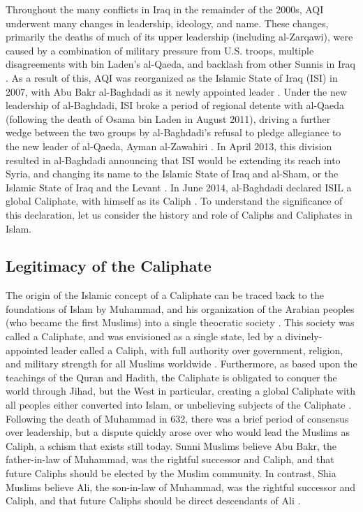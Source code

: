\documentclass{report}
\begin{document}
    Throughout the many conflicts in Iraq in the remainder of the 2000s, AQI underwent many changes in leadership, ideology, and name. These changes, primarily the deaths of much of its upper leadership (including al-Zarqawi), were caused by a combination of military pressure from U.S. troops, multiple disagreements  with bin Laden's al-Qaeda, and backlash from other Sunnis in Iraq \cite{Zelin2014,Kahl2008}. As a result of this, AQI was reorganized as the Islamic State of Iraq (ISI) in 2007, with Abu Bakr al-Baghdadi as it newly appointed leader \cite{Zelin2014,Shadid2010}. Under the new leadership of al-Baghdadi, ISI broke a period of regional detente with al-Qaeda (following the death of Osama bin Laden in August 2011), driving a further wedge between the two groups by al-Baghdadi's refusal to pledge allegiance to the new leader of al-Qaeda, Ayman al-Zawahiri \cite{Al-Jawlani}. In April 2013, this division resulted in  al-Baghdadi announcing that ISI would be extending its reach into Syria, and changing its name to the Islamic State of Iraq and al-Sham, or the Islamic State of Iraq and the Levant \cite{Zelin2014,Al-Hussaini2013}. In June 2014, al-Baghdadi declared ISIL a global Caliphate, with himself as its Caliph \cite{Mortada2014,TheWeek2014}. To understand the significance of this declaration, let us consider the history and role of Caliphs and Caliphates in Islam.
    
    


\subsection{Legitimacy of the Caliphate}

The origin of the Islamic concept of a Caliphate can be traced back to the foundations of Islam by Muhammad, and his organization of the Arabian peoples (who became the first Muslims) into a single theocratic society  \cite{schmidt2004great,holt1977cambridge}. This society was called a Caliphate, and was envisioned as a single state, led by a divinely-appointed leader called a Caliph, with full authority over government, religion, and military strength for all Muslims worldwide \cite{lapidus2002history}. Furthermore, as based upon the teachings of the Quran and Hadith, the Caliphate is obligated to conquer the world through Jihad, but the West in particular, creating a global Caliphate with all peoples either converted into Islam, or unbelieving subjects of the Caliphate \cite{dawood2003koran,arabi2008divine,karsh2007islamic}. Following the death of Muhammad in 632, there was a brief period of consensus over leadership, but a dispute quickly arose over who would lead the Muslims as Caliph, a schism that exists still today. Sunni Muslims believe  Abu Bakr, the father-in-law of Muhammad, was the rightful successor and Caliph, and that future Caliphs should be elected by the Muslim community. In contrast, Shia Muslims believe  Ali, the son-in-law of Muhammad, was the rightful successor and Caliph, and that future Caliphs should be direct descendants of Ali \cite{karsh2007islamic,schmidt2004great}. 
\end{document}

